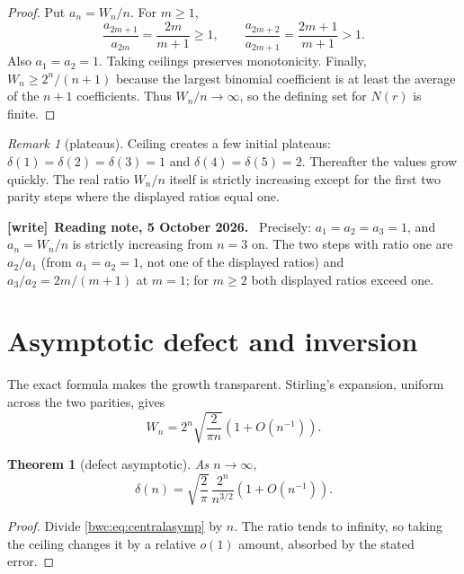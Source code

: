 \documentclass[11pt,letterpaper]{article}
\numberwithin{equation}{section}
\theoremstyle{plain}
\newtheorem{theorem}{Theorem}[section]
\theoremstyle{definition}
\theoremstyle{remark}
\newtheorem{remark}[remark]{Remark}
\newenvironment{writenote}[1][]{\par\smallskip\begingroup\small
 \noindent\textbf{[write]}\if\relax\detokenize{#1}\relax\else~\textbf{#1.}\fi\ }%
 {\par\endgroup\smallskip}
\begin{document}
\begin{proof}
Put $a_n=W_n/n$.  For $m\geq1$,
\[
 \frac{a_{2m+1}}{a_{2m}}
 =\frac{2m}{m+1}\geq1,
\qquad
 \frac{a_{2m+2}}{a_{2m+1}}
 =\frac{2m+1}{m+1}>1.
\]
Also $a_1=a_2=1$.  Taking ceilings preserves monotonicity.  Finally,
$W_n\geq2^n/(n+1)$ because the largest binomial coefficient is at least the
average of the $n+1$ coefficients.  Thus $W_n/n\to\infty$, so the defining
set for $N(r)$ is finite.
\end{proof}

\begin{remark}[plateaus]
Ceiling creates a few initial plateaus: $\delta(1)=\delta(2)=\delta(3)=1$ and
$\delta(4)=\delta(5)=2$.  Thereafter the values grow quickly.  The real ratio
$W_n/n$ itself is strictly increasing except for the first two parity steps
where the displayed ratios equal one.
\end{remark}

\begin{writenote}[Reading note, 5 October 2026]
Precisely: $a_1=a_2=a_3=1$, and $a_n=W_n/n$ is strictly increasing from
$n=3$ on. The two steps with ratio one are $a_2/a_1$ (from $a_1=a_2=1$, not
one of the displayed ratios) and $a_3/a_2=2m/(m+1)$ at $m=1$; for $m\geq2$
both displayed ratios exceed one.
\end{writenote}

\section{Asymptotic defect and inversion}\label{bwc:sec:asymptotics}

The exact formula makes the growth transparent.  Stirling's expansion,
uniform across the two parities, gives
\begin{equation}\label{bwc:eq:centralasymp}
 W_n=2^n\sqrt{\frac{2}{\pi n}}\left(1+O(n^{-1})\right).
\end{equation}

\begin{theorem}[defect asymptotic]\label{bwc:thm:defectasymp}
As $n\to\infty$,
\[
 \delta(n)=\sqrt{\frac2\pi}\,\frac{2^n}{n^{3/2}}
              \left(1+O(n^{-1})\right).
\]
\end{theorem}

\begin{proof}
Divide \cref{bwc:eq:centralasymp} by $n$.  The ratio tends to infinity, so taking
the ceiling changes it by a relative $o(1)$ amount, absorbed by the stated
error.
\end{proof}
\end{document}
